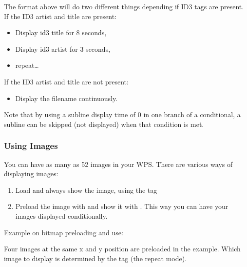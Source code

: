The format above will do two different things depending if ID3 tags are
present. If the ID3 artist and title are present:
\begin{itemize}
\item Display id3 title for 8 seconds,
\item Display id3 artist for 3 seconds,
\item repeat\dots
\end{itemize}
If the ID3 artist and title are not present:
\begin{itemize}
\item Display the filename continuously.
\end{itemize}
Note that by using a subline display time of 0 in one branch of a conditional,
a subline can be skipped (not displayed) when that condition is met.

\subsubsection{Using Images}
You can have as many as 52 images in your WPS. There are various ways of
displaying images:
\begin{enumerate}
  \item Load and always show the image, using the  tag
  \item Preload the image with  and show it with .
    This way you can have your images displayed conditionally.
\end{enumerate}

%

Example on bitmap preloading and use:
\begin{example}
\end{example}
Four images at the same x and y position are preloaded in the example. Which
image to display is determined by the  tag (the repeat mode).

